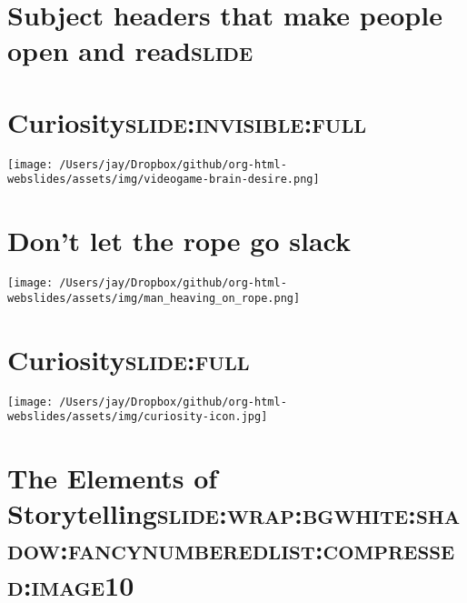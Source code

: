 \documentclass[12pt]{article}
\begin{document}
\section[\textbf{Subject headers} that make people \textbf{open} and \textbf{read}]{\textbf{Subject headers} that make people \textbf{open} and \textbf{read}\hfill{}\textsc{slide}}
\label{sec:org709dcbf}

\section[Curiosity]{Curiosity\hfill{}\textsc{slide:invisible:full}}
\label{sec:org1bcdbae}
\begin{center}
\texttt{[image: /Users/jay/Dropbox/github/org-html-webslides/assets/img/videogame-brain-desire.png]}
\end{center}

\section{Don't let the \textbf{rope} go \textbf{slack}}
\label{sec:orgb698336}
\begin{center}
\texttt{[image: /Users/jay/Dropbox/github/org-html-webslides/assets/img/man\_heaving\_on\_rope.png]}
\end{center}

\section[Curiosity]{Curiosity\hfill{}\textsc{slide:full}}
\label{sec:org1078964}
\begin{center}
\texttt{[image: /Users/jay/Dropbox/github/org-html-webslides/assets/img/curiosity-icon.jpg]}
\end{center}

\section[The \textbf{Elements} of \textbf{Storytelling}]{The \textbf{Elements} of \textbf{Storytelling}\hfill{}\textsc{slide:wrap:bgwhite:shadow:fancynumberedlist:compressed:image10}}
\label{sec:org0df550f}
\end{document}
